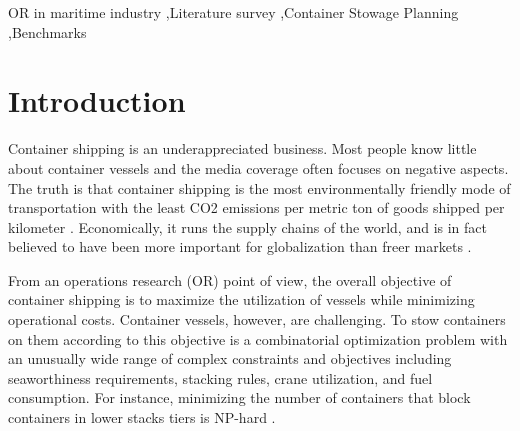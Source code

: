 \documentclass[preprint,12pt,authoryear]{elsarticle}
\begin{document}
\begin{frontmatter}
\begin{highlights}
\end{highlights}

\begin{keyword}
OR in maritime industry \sep Literature survey \sep Container Stowage Planning \sep Benchmarks
\end{keyword}

\end{frontmatter}



\section{Introduction}
\label{sec:introduction}
Container shipping is an underappreciated business. Most people know little about container vessels and the media coverage often focuses on negative aspects. The truth is that container shipping is the most environmentally friendly mode of transportation with the least CO2 emissions per metric ton of goods shipped per kilometer \citep{InternationalChamberofShipping2023EnvironmentalTransport}.
Economically, it runs the supply chains of the world, and is in fact believed to have been more important for globalization than freer markets \citep{TheEconomist2013FreeHero}.

From an operations research (OR) point of view, the overall objective of container shipping is to maximize the utilization of vessels while minimizing operational costs. Container vessels, however, are challenging. To stow containers on them according to this objective is a combinatorial optimization problem with an unusually wide range of complex constraints and objectives including seaworthiness requirements, stacking rules, crane utilization, and fuel consumption. For instance, minimizing the number of containers that block containers in lower stacks tiers is NP-hard \citep{Avriel2000ContainerGraphs}. 
\end{document}

